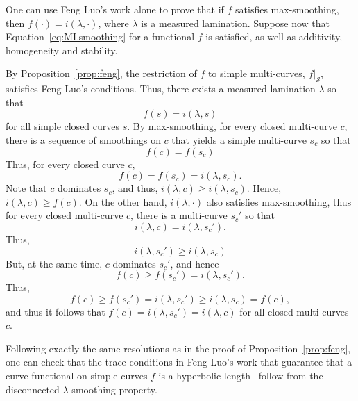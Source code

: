 \begin{remark}
One can use Feng Luo's work alone to prove that if $f$ satisfies max-smoothing, then $f(\cdot)=i(\lambda,\cdot)$, where $\lambda$ is a measured lamination.
Suppose now that Equation~\eqref{eq:MLsmoothing} for a functional $f$ is satisfied, as well as additivity, homogeneity and stability. 

By Proposition~\ref{prop:feng}, the restriction of $f$ to simple multi-curves, $f|_{\mathcal{S}}$, satisfies Feng Luo's conditions.
Thus, there exists a measured lamination $\lambda$ so that
\[
f(s)=i(\lambda, s)
\]
for all simple closed curves $s$.
By max-smoothing, for every closed multi-curve $c$, there is a sequence of smoothings on $c$ that yields a simple multi-curve $s_c$ so that
\[
f(c)=f(s_c)
\]
Thus, for every closed curve $c$,
\[
f(c)=f(s_c)=i(\lambda,s_c).
\]
Note that $c$ dominates $s_c$, and thus,
$i(\lambda,c) \geq i(\lambda,s_c)$.
Hence, $i(\lambda,c) \geq f(c)$.
On the other hand, $i(\lambda,\cdot)$ also satisfies max-smoothing, thus for every closed multi-curve $c$, there is a multi-curve $s_c'$ so that
\[
i(\lambda,c)=i(\lambda,s_c').
\]
Thus,
\[
i(\lambda,s_c') \geq i(\lambda,s_c)
\]
But, at the same time, $c$ dominates $s_c'$, and hence
\[
f(c) \geq f(s_c')=i(\lambda,s_c').
\]
Thus,
\[
f(c) \geq f(s_c')=i(\lambda,s_c') \geq i(\lambda, s_c)=f(c),
\]
and thus it follows that $f(c)=i(\lambda,s_c')=i(\lambda,c)$
for all closed multi-curves $c$.
\end{remark}

\begin{remark}
Following exactly the same resolutions as in the proof of Proposition~\ref{prop:feng}, one can check that the trace conditions in Feng Luo's work that guarantee that a curve functional on simple curves $f$ is a hyperbolic length~\cite{Luo98:GeodesicLength} follow from the disconnected $\lambda$-smoothing property.
\end{remark}
